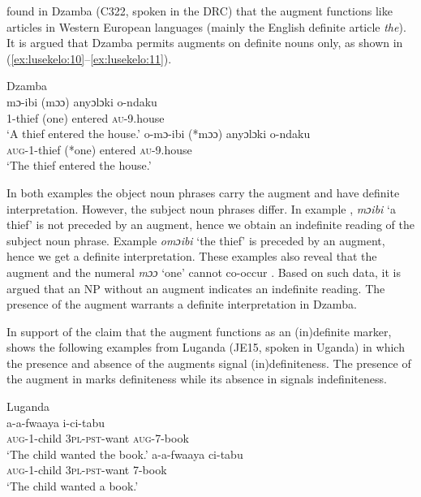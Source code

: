 \documentclass[output=paper]{langscibook}
\begin{document}
\citet{Bokamba1971} found in Dzamba (C322, spoken in the DRC) that the augment functions like articles in Western European languages (mainly the English definite article {\textit{the}}). It is argued that Dzamba permits augments on definite nouns only, as shown in (\ref{ex:lusekelo:10}--\ref{ex:lusekelo:11}). 

\ea%
    Dzamba \citep[220]{Bokamba1971}\label{ex:lusekelo:10}\\
    \gll mɔ{}-ibi  (mɔɔ)  anyɔlɔki  o-ndaku\\ 
  1-thief  (one)  entered  \textsc{au}{}-9.house\\
   \glt  ‘A thief entered the house.’
\ex%
    \label{ex:lusekelo:11}
    \gll  o-mɔ{}-ibi    (*mɔɔ)  anyɔlɔki  o-ndaku\\
  \textsc{aug}{}-1-thief  (*one)  entered  \textsc{au}{}-9.house          \\
 \glt ‘The thief entered the house.’
\z

In both examples the object noun phrases carry the augment and have definite interpretation. However, the subject noun phrases differ. In example , \textit{mɔibi} ‘a thief’ is not preceded by an augment, hence we obtain an indefinite reading of the subject noun phrase. Example  \textit{omɔibi} ‘the thief’ is preceded by an augment, hence we get a definite interpretation. These examples also reveal that the augment and the numeral \textit{mɔɔ} ‘one’ cannot co-occur \citep{Bokamba1971}. Based on such data, it is argued that an NP without an augment indicates an indefinite reading. The presence of the augment warrants a definite interpretation in Dzamba.  

In support of the claim that the augment functions as an (in)definite marker, \citet[71]{Asiimwe2014} shows the following examples from Luganda (JE15, spoken in Uganda) in which the presence and absence of the augments signal (in)def\-i\-nite\-ness. The presence of the augment in  marks definiteness while its absence in  signals indefiniteness. 

\ea%
  Luganda \citep[71]{Asiimwe2014}  \label{ex:lusekelo:12}\\
     {a-a-fwaaya}  {i-ci-tabu}  \\
  \textsc{aug}-1-child  3\textsc{pl}-\textsc{pst}-want  \textsc{aug}-7-book \\
  \glt ‘The child wanted the book.’
\ex%
    \label{ex:lusekelo:13}
      {a-a-fwaaya}  {ci-tabu}\\
  \textsc{aug}-1-child  3\textsc{pl}-\textsc{pst}-want  7-book\\
  \glt ‘The child wanted a book.’
\z
\end{document}
